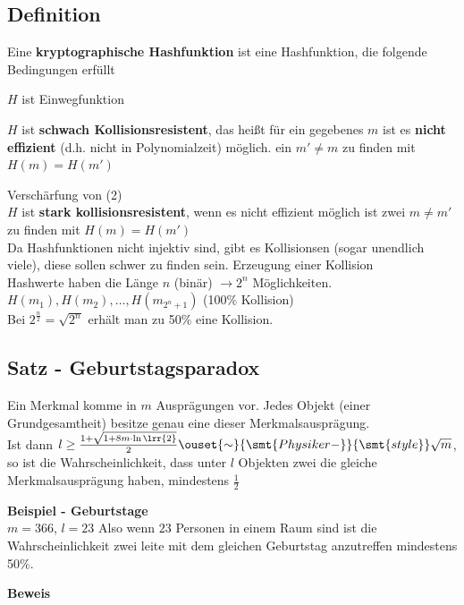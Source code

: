 	\subsection{Definition}
	Eine \textbf{kryptographische Hashfunktion} ist eine Hashfunktion, die folgende Bedingungen erfüllt
		\item $H$ ist Einwegfunktion
		\item $H$ ist \textbf{schwach Kollisionsresistent}, das heißt für ein gegebenes $m$ ist es \textbf{nicht effizient} (d.h. nicht in Polynomialzeit) möglich. ein $m'\neq m$ zu finden mit $H(m)=H(m')$
		\item[(2)'] Verschärfung von (2)\\
			$H$ ist \textbf{stark kollisionsresistent}, wenn es nicht effizient möglich ist zwei $m\neq m'$ zu finden mit $H(m)=H(m')$\\
			Da Hashfunktionen nicht injektiv sind, gibt es Kollisionsen (sogar unendlich viele), diese sollen schwer zu finden sein.
	\subExEnd
	Erzeugung einer Kollision\\
	Hashwerte haben die Länge $n$ (binär) $\rightarrow 2^n$ Möglichkeiten.\\
	$H(m_1),H(m_2),\dots,H(m_{2^n+1})$ (100\% Kollision)\\
	Bei $2^{\frac{n}{2}}=\sqrt{2^n}$ erhält man zu 50\% eine Kollision.
	
\subsection{Satz - Geburtstagsparadox}
	Ein Merkmal komme in $m$ Ausprägungen vor. Jedes Objekt (einer Grundgesamtheit) besitze genau eine dieser Merkmalsausprägung.\\
	Ist dann $l\geq\frac{1+\sqrt{1+8m\cdot\ln\lrr{2}}}{2}\ouset{\sim}{\smt{Physiker-}}{\smt{style}}\sqrt{m}$, so ist die Wahrscheinlichkeit, dass unter $l$ Objekten zwei die gleiche Merkmalsausprägung haben, mindestens $\frac{1}{2}$
	
	\textbf{Beispiel - Geburtstage}\\
	$m=366$, $l=23$ Also wenn $23$ Personen in einem Raum sind ist die Wahrscheinlichkeit zwei leite mit dem gleichen Geburtstag anzutreffen mindestens 50\%.
	
	\textbf{Beweis}
	
